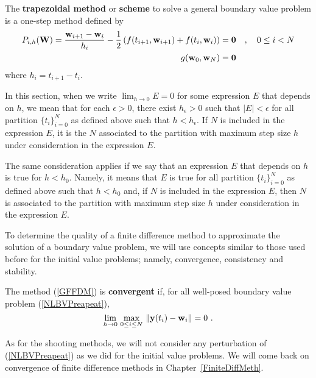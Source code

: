 \begin{egg}
The {\bfseries trapezoidal method} or {\bfseries scheme}
 to solve a
general boundary value problem is a one-step method defined by
\begin{align*}
P_{i,h}(\mathbf{W}) = \frac{\mathbf{w}_{i+1}-\mathbf{w}_i}{h_i} - \frac{1}{2}
\left( f(t_{i+1},\mathbf{w}_{i+1}) + f(t_i,\mathbf{w}_i)\right)
&= \mathbf{0} \quad , \quad 0 \leq i < N\\
g(\mathbf{w}_0, \mathbf{w}_N) &= \mathbf{0}
\end{align*}
where $h_i = t_{i+1}- t_i$.
\end{egg}

\begin{rmk}[Important]
In this section, when we write $\displaystyle \lim_{h\to 0} E = 0$
for some expression $E$ that depends on $h$, we mean that for each
$\epsilon >0$, there exist $h_\epsilon >0$ such that
$|E| < \epsilon$ for all partition $\{t_i\}_{i=0}^N$ as defined
above such that $h<h_\epsilon$.  If $N$ is included in the expression
$E$, it is the $N$ associated to the partition with maximum step size
$h$ under consideration in the expression $E$. 

The same consideration applies if we say that an expression $E$ that
depends on $h$ is true for $h < h_0$.  Namely, it means that $E$ is
true for all partition $\{t_i\}_{i=0}^N$ as defined
above such that $h<h_0$ and, if $N$ is included in the expression
$E$, then $N$ is associated to the partition with maximum step size
$h$ under consideration in the expression $E$.
\end{rmk}

To determine the quality of a finite difference method to approximate
the solution of a boundary value problem, we will use concepts similar
to those used before for the initial value problems; namely,
convergence, consistency and stability.

\begin{defn}
The method (\ref{GFFDM}) is
{\bfseries convergent} if, for all
well-posed boundary value problem (\ref{NLBVPreapeat}),
\[
\lim_{h \rightarrow 0}\,\max_{0\leq i \leq N} \,
\| \mathbf{y}(t_i) - \mathbf{w}_i \| = 0 \ .
\]
\end{defn}

\begin{rmk}
As for the shooting methods, we will not consider any perturbation of
(\ref{NLBVPreapeat}) as we did for the initial value problems.  We
will come back on convergence of finite difference methods in
Chapter~\ref{FiniteDiffMeth}. 
\end{rmk}

